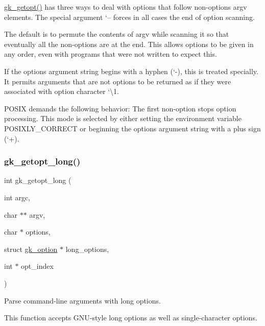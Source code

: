 \hyperlink{a00038_af82cf3b0fb9ec4411a987f02df3b2e47}{gk\+\_\+getopt()} has three ways to deal with options that follow non-\/options {\ttfamily argv} elements. The special argument {\ttfamily `--\textquotesingle{}} forces in all cases the end of option scanning.
\begin{DoxyItemize}
\item The default is to permute the contents of {\ttfamily argv} while scanning it so that eventually all the non-\/options are at the end. This allows options to be given in any order, even with programs that were not written to expect this.
\item If the options argument string begins with a hyphen (`-\/\textquotesingle{}), this is treated specially. It permits arguments that are not options to be returned as if they were associated with option character `\textbackslash{}1\textquotesingle{}.
\item P\+O\+S\+IX demands the following behavior\+: The first non-\/option stops option processing. This mode is selected by either setting the environment variable P\+O\+S\+I\+X\+L\+Y\+\_\+\+C\+O\+R\+R\+E\+CT or beginning the options argument string with a plus sign (`+\textquotesingle{}). 
\end{DoxyItemize}\mbox{\label{a00038_a1c3b8d80bd9620dc66f24d4854c0f6d3}} 
\subsubsection{\texorpdfstring{gk\+\_\+getopt\+\_\+long()}{gk\_getopt\_long()}}
{\footnotesize\ttfamily int gk\+\_\+getopt\+\_\+long (\begin{DoxyParamCaption}\item[{int}]{argc,  }\item[{char $\ast$$\ast$}]{argv,  }\item[{char $\ast$}]{options,  }\item[{struct \hyperlink{a00630}{gk\+\_\+option} $\ast$}]{long\+\_\+options,  }\item[{int $\ast$}]{opt\+\_\+index }\end{DoxyParamCaption})}



Parse command-\/line arguments with long options. 

This function accepts G\+N\+U-\/style long options as well as single-\/character options.


